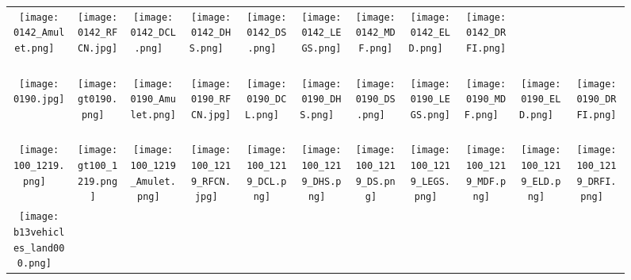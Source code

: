 \documentclass[10pt,twocolumn,letterpaper]{article}
\begin{document}
\begin{figure*}
\begin{tabular}{@{}c@{}c@{}c@{}c@{}c@{}c@{}c@{}c@{}c@{}c@{}c}
\texttt{[image: 0142\_Amulet.png]} \ &
\texttt{[image: 0142\_RFCN.jpg]} \ &
\texttt{[image: 0142\_DCL.png]} \ &
\texttt{[image: 0142\_DHS.png]} \ &
\texttt{[image: 0142\_DS.png]} \ &
\texttt{[image: 0142\_LEGS.png]} \ &
\texttt{[image: 0142\_MDF.png]} \ &
\texttt{[image: 0142\_ELD.png]} \ &
\texttt{[image: 0142\_DRFI.png]} \ \\
\vspace{-1mm}
\texttt{[image: 0190.jpg]} \ &
\texttt{[image: gt0190.png]} \ &
\texttt{[image: 0190\_Amulet.png]} \ &
\texttt{[image: 0190\_RFCN.jpg]} \ &
\texttt{[image: 0190\_DCL.png]} \ &
\texttt{[image: 0190\_DHS.png]} \ &
\texttt{[image: 0190\_DS.png]} \ &
\texttt{[image: 0190\_LEGS.png]} \ &
\texttt{[image: 0190\_MDF.png]} \ &
\texttt{[image: 0190\_ELD.png]} \ &
\texttt{[image: 0190\_DRFI.png]} \ \\
\vspace{-1mm}
\texttt{[image: 100\_1219.png]} \ &
\texttt{[image: gt100\_1219.png]} \ &
\texttt{[image: 100\_1219\_Amulet.png]} \ &
\texttt{[image: 100\_1219\_RFCN.jpg]} \ &
\texttt{[image: 100\_1219\_DCL.png]} \ &
\texttt{[image: 100\_1219\_DHS.png]} \ &
\texttt{[image: 100\_1219\_DS.png]} \ &
\texttt{[image: 100\_1219\_LEGS.png]} \ &
\texttt{[image: 100\_1219\_MDF.png]} \ &
\texttt{[image: 100\_1219\_ELD.png]} \ &
\texttt{[image: 100\_1219\_DRFI.png]} \ \\
\vspace{-1mm}
\texttt{[image: b13vehicles\_land000.png]} \ &

\end{tabular}
\end{figure*}
\end{document}
